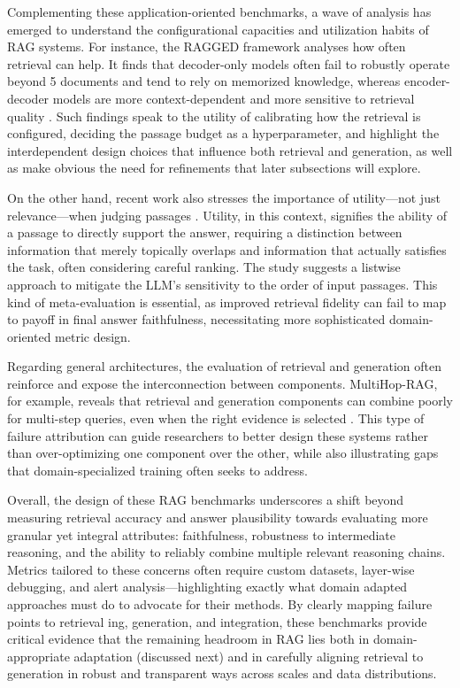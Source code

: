 \documentclass[11pt]{article}
\begin{document}
Complementing these application-oriented benchmarks, a wave of analysis has emerged to understand the configurational capacities and utilization habits of RAG systems. For instance, the RAGGED framework analyses how often retrieval can help. It finds that decoder-only models often fail to robustly operate beyond 5 documents and tend to rely on memorized knowledge, whereas encoder-decoder models are more context-dependent and more sensitive to retrieval quality \cite{ref7}. Such findings speak to the utility of calibrating how the retrieval is configured, deciding the passage budget as a hyperparameter, and highlight the interdependent design choices that influence both retrieval and generation, as well as make obvious the need for refinements that later subsections will explore.

On the other hand, recent work also stresses the importance of utility---not just relevance---when judging passages \cite{ref53}. Utility, in this context, signifies the ability of a passage to directly support the answer, requiring a distinction between information that merely topically overlaps and information that actually satisfies the task, often considering careful ranking. The study suggests a listwise approach to mitigate the LLM's sensitivity to the order of input passages. This kind of meta-evaluation is essential, as improved retrieval fidelity can fail to map to payoff in final answer faithfulness, necessitating more sophisticated domain-oriented metric design.

Regarding general architectures, the evaluation of retrieval and generation often reinforce and expose the interconnection between components. MultiHop-RAG, for example, reveals that retrieval and generation components can combine poorly for multi-step queries, even when the right evidence is selected \cite{ref8}. This type of failure attribution can guide researchers to better design these systems rather than over-optimizing one component over the other, while also illustrating gaps that domain-specialized training often seeks to address.

Overall, the design of these RAG benchmarks underscores a shift beyond measuring retrieval accuracy and answer plausibility towards evaluating more granular yet integral attributes: faithfulness, robustness to intermediate reasoning, and the ability to reliably combine multiple relevant reasoning chains. Metrics tailored to these concerns often require custom datasets, layer-wise debugging, and alert analysis---highlighting exactly what domain adapted approaches must do to advocate for their methods. By clearly mapping failure points to retrieval ing, generation, and integration, these benchmarks provide critical evidence that the remaining headroom in RAG lies both in domain-appropriate adaptation (discussed next) and in carefully aligning retrieval to generation in robust and transparent ways across scales and data distributions.
\end{document}
